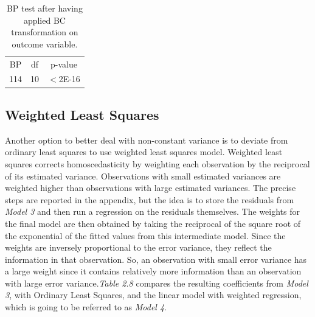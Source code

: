 \documentclass{book}
\begin{document}
\bigskip
\begin{table}[H]
\begin{center}
\begin{tabular}{|c|c|c|}
\hline
\rowcolor{lightgray} \multicolumn{3}{|c|}{BP Test}\\
\hline
BP&df&p-value\\
114&10&$<$2E-16\\
\hline
\end{tabular}
\caption{BP test after having applied BC transformation on outcome variable.}
\end{center}
\end{table}
\bigskip

\subsection{Weighted Least Squares}

Another option to better deal with non-constant variance is to deviate from ordinary least squares to use weighted least squares model. Weighted least squares corrects homoscedasticity by weighting each observation by the reciprocal of its estimated variance. Observations with small estimated variances are weighted higher than observations with large estimated variances. The precise steps are reported in the appendix, but the idea is to store the residuals from \textit{Model 3} and then run a regression on the residuals themselves. The weights for the final model are then obtained by taking the reciprocal of the square root of the exponential of the fitted values from this intermediate model. Since the weights are inversely proportional to the error variance, they reflect the information in that observation. So, an observation with small error variance has a large weight since it contains relatively more information than an observation with large error variance.\textit{Table 2.8} compares the resulting coefficients from \textit{Model 3}, with Ordinary Least Squares, and the linear model with weighted regression, which is going to be referred to as \textit{Model 4}.
\end{document}
